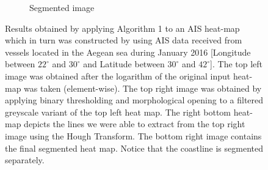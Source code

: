 \documentclass{article}
\begin{document}
\begin{figure}[h]
\begin{subfigure}[b]{0.5\linewidth}
    \caption{Segmented image} 
    \label{fig7:d} 
  \end{subfigure} 
  \caption{Results obtained by applying Algorithm 1 to an AIS heat-map which in turn was constructed by using AIS data received from vessels located in the Aegean sea during January 2016 [Longitude between $22^{\circ}$ and $30^{\circ}$ and Latitude between $30^{\circ}$ and $42^{\circ}$]. The top left image was obtained after the logarithm of the original input heat-map was taken (element-wise). The top right image 
  was obtained by applying binary thresholding and morphological opening to a filtered greyscale variant of the top left heat map. The right bottom heat-map depicts the lines we were able to extract 
  from the top right image using the Hough Transform. The bottom right image contains the final segmented heat map. Notice that the coastline is segmented separately.}
  \label{fig7} 
\end{figure}
\end{document}
